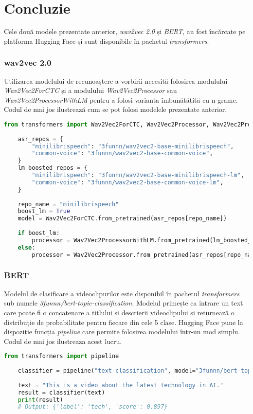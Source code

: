\section{Concluzie}
Cele două modele prezentate anterior, \textit{wav2vec 2.0} și \textit{BERT}, au fost încărcate
pe platforma Hugging Face și sunt disponibile în pachetul \textit{transformers}.

\subsubsection{wav2vec 2.0}
Utilizarea modelului de recunoaștere a vorbirii necesită folosirea modulului \textit{Wav2Vec2ForCTC}
și a modulului \textit{Wav2Vec2Processor} sau \textit{Wav2Vec2ProcessorWithLM} pentru a folosi varianta
îmbunătățită cu n-grame. Codul de mai jos ilustrează cum se pot folosi modelele prezentate anterior.

\begin{lstlisting}[language=Python]
    from transformers import Wav2Vec2ForCTC, Wav2Vec2Processor, Wav2Vec2ProcessorWithLM
    
    asr_repos = {
        "minilibrispeech": "3funnn/wav2vec2-base-minilibrispeech",
        "common-voice": "3funnn/wav2vec2-base-common-voice",
    }
    lm_boosted_repos = {
        "minilibrispeech": "3funnn/wav2vec2-base-minilibrispeech-lm",
        "common-voice": "3funnn/wav2vec2-base-common-voice-lm",
    }
    
    repo_name = "minilibrispeech"
    boost_lm = True
    model = Wav2Vec2ForCTC.from_pretrained(asr_repos[repo_name])
    
    if boost_lm:
        processor = Wav2Vec2ProcessorWithLM.from_pretrained(lm_boosted_repos[repo_name])
    else:
        processor = Wav2Vec2Processor.from_pretrained(asr_repos[repo_name])
    \end{lstlisting}


\subsubsection{BERT}
Modelul de clasificare a videoclipurilor este disponibil în pachetul \textit{transformers} sub numele
\textit{3funnn/bert-topic-classification}. Modelul primește ca intrare un text care poate fi o 
concatenare a titlului și descrierii videoclipului și returnează o distribuție de probabilitate
pentru fiecare din cele 5 clase. Hugging Face pune la dispoziție funcția \textit{pipeline} care
permite folosirea modelului într-un mod simplu. Codul de mai jos ilustreaza acest lucru.

\begin{lstlisting}[language=Python]
    from transformers import pipeline
    
    classifier = pipeline("text-classification", model="3funnn/bert-topic-classification")
    
    text = "This is a video about the latest technology in AI."
    result = classifier(text)
    print(result)
    # Output: {'label': 'tech', 'score': 0.897}
\end{lstlisting}
